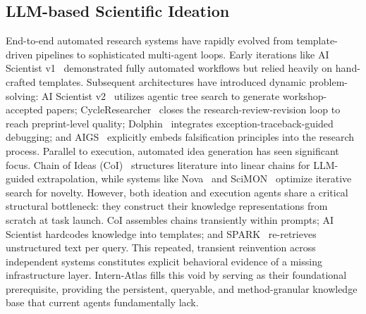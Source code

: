 \documentclass{llmxive}
\begin{document}
\subsection{LLM-based Scientific Ideation}
End-to-end automated research systems have rapidly evolved from template-driven pipelines to sophisticated multi-agent loops. Early iterations like AI Scientist v1~\cite{lu2024ai} demonstrated fully automated workflows but relied heavily on hand-crafted templates. Subsequent architectures have introduced dynamic problem-solving: AI Scientist v2~\cite{yamada2025ai} utilizes agentic tree search to generate workshop-accepted papers; CycleResearcher~\cite{weng2024cycleresearcher} closes the research-review-revision loop to reach preprint-level quality; Dolphin~\cite{yuan2025dolphin} integrates exception-traceback-guided debugging; and AIGS~\cite{liu2024aigs} explicitly embeds falsification principles into the research process.
Parallel to execution, automated idea generation has seen significant focus. Chain of Ideas (CoI)~\cite{li2024chain} structures literature into linear chains for LLM-guided extrapolation, while systems like Nova~\cite{hu2024nova} and SciMON~\cite{wang2024scimon} optimize iterative search for novelty. However, both ideation and execution agents share a critical structural bottleneck: they construct their knowledge representations from scratch at task launch. CoI assembles chains transiently within prompts; AI Scientist hardcodes knowledge into templates; and SPARK~\cite{sanyal2025spark} re-retrieves unstructured text per query. 
This repeated, transient reinvention across independent systems constitutes explicit behavioral evidence of a missing infrastructure layer. {Intern-Atlas} fills this void by serving as their foundational prerequisite, providing the persistent, queryable, and method-granular knowledge base that current agents fundamentally lack.
\end{document}
